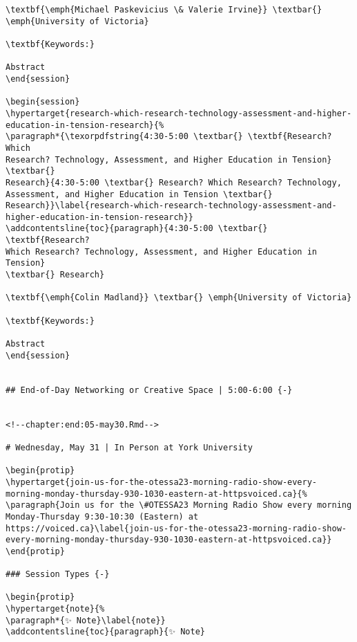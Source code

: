 \documentclass[
]{book}
\begin{document}
\begin{verbatim}
\textbf{\emph{Michael Paskevicius \& Valerie Irvine}} \textbar{}
\emph{University of Victoria}

\textbf{Keywords:}

Abstract
\end{session}

\begin{session}
\hypertarget{research-which-research-technology-assessment-and-higher-education-in-tension-research}{%
\paragraph*{\texorpdfstring{4:30-5:00 \textbar{} \textbf{Research? Which
Research? Technology, Assessment, and Higher Education in Tension}
\textbar{}
Research}{4:30-5:00 \textbar{} Research? Which Research? Technology, Assessment, and Higher Education in Tension \textbar{} Research}}\label{research-which-research-technology-assessment-and-higher-education-in-tension-research}}
\addcontentsline{toc}{paragraph}{4:30-5:00 \textbar{} \textbf{Research?
Which Research? Technology, Assessment, and Higher Education in Tension}
\textbar{} Research}

\textbf{\emph{Colin Madland}} \textbar{} \emph{University of Victoria}

\textbf{Keywords:}

Abstract
\end{session}


## End-of-Day Networking or Creative Space | 5:00-6:00 {-}


<!--chapter:end:05-may30.Rmd-->

# Wednesday, May 31 | In Person at York University

\begin{protip}
\hypertarget{join-us-for-the-otessa23-morning-radio-show-every-morning-monday-thursday-930-1030-eastern-at-httpsvoiced.ca}{%
\paragraph{Join us for the \#OTESSA23 Morning Radio Show every morning
Monday-Thursday 9:30-10:30 (Eastern) at
https://voiced.ca}\label{join-us-for-the-otessa23-morning-radio-show-every-morning-monday-thursday-930-1030-eastern-at-httpsvoiced.ca}}
\end{protip}

### Session Types {-}

\begin{protip}
\hypertarget{note}{%
\paragraph*{✨ Note}\label{note}}
\addcontentsline{toc}{paragraph}{✨ Note}


\end{verbatim}
\end{document}
